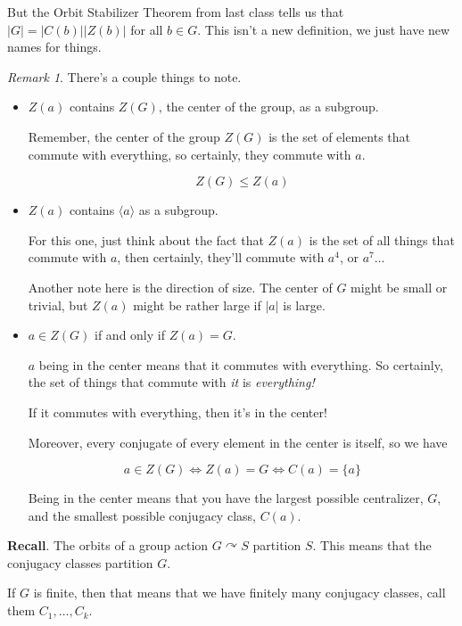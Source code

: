 \documentclass[12pt]{article}
\def\acts{\curvearrowright} %
\newcommand{\lr}[1]{\langle #1 \rangle}
\theoremstyle{remark}
\theoremstyle{remark}
\theoremstyle{remark}
\theoremstyle{remark}
\newtheorem*{remark}{Remark}
\theoremstyle{remark}
\begin{document}
But the Orbit Stabilizer Theorem from last class tells us that $|G| =
|C(b)||Z(b)|$ for all $b \in G$. This isn't a new definition, we just have new
names for things.

\begin{remark}
  There's a couple things to note.

  \begin{itemize}
    \item $Z(a)$ contains $Z(G)$, the center of the group, as a subgroup.

      Remember, the center of the group $Z(G)$ is the set of elements that commute
      with everything, so certainly, they commute with $a$.

      \[
        Z(G) \le Z(a)
      \]

    \item $Z(a)$ contains $\lr {a}$ as a subgroup.

      For this one, just think about the fact that $Z(a)$ is the set of all things
      that commute with $a$, then certainly, they'll commute with $a^4$, or
      $a^7$...

      Another note here is the direction of size. The center of $G$ might be small
      or trivial, but $Z(a)$ might be rather large if $|a|$ is large.

    \item $a \in Z(G)$ if and only if $Z(a) = G$.

      $a$ being in the center means that it commutes with everything. So
      certainly, the set of things that commute with {\it it} is {\it everything!}

      If it commutes with everything, then it's in the center!

      Moreover, every conjugate of every element in the center is itself, so we
      have

      \[
        a \in Z(G) \Leftrightarrow Z(a) = G \Leftrightarrow C(a) = \{ a \}
      \]

      Being in the center means that you have the largest possible centralizer,
      $G$, and the smallest possible conjugacy class, $C(a)$.
  \end{itemize}
\end{remark}

{\bf Recall}. The orbits of a group action $G \acts S$ partition $S$. This means
that the conjugacy classes partition $G$.

If $G$ is finite, then that means that we have finitely many conjugacy classes,
call them $C_1, \dots, C_k$.
\end{document}
